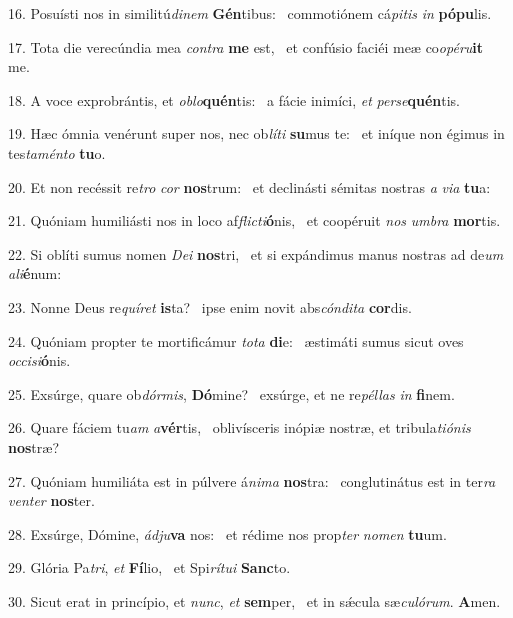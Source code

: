 16. Posuísti nos in similitú\textit{di}\textit{nem} \textbf{Gén}tibus: \ast\  commotiónem cá\textit{pi}\textit{tis} \textit{in} \textbf{pó}\textbf{pu}lis.\

17. Tota die verecúndia mea \textit{con}\textit{tra} \textbf{me} est, \ast\  et confúsio faciéi meæ co\textit{o}\textit{pé}\textit{ru}\textbf{it} me.\

18. A voce exprobrántis, et \textit{ob}\textit{lo}\textbf{quén}tis: \ast\  a fácie inimíci, \textit{et} \textit{per}\textit{se}\textbf{quén}tis.\

19. Hæc ómnia venérunt super nos, nec ob\textit{lí}\textit{ti} \textbf{su}mus te: \ast\  et iníque non égimus in tes\textit{ta}\textit{mén}\textit{to} \textbf{tu}o.\

20. Et non recéssit re\textit{tro} \textit{cor} \textbf{nos}trum: \ast\  et declinásti sémitas nostras \textit{a} \textit{vi}\textit{a} \textbf{tu}a:\

21. Quóniam humiliásti nos in loco af\textit{flic}\textit{ti}\textbf{ó}nis, \ast\  et coopéruit \textit{nos} \textit{um}\textit{bra} \textbf{mor}tis.\

22. Si oblíti sumus nomen \textit{De}\textit{i} \textbf{nos}tri, \ast\  et si expándimus manus nostras ad de\textit{um} \textit{a}\textit{li}\textbf{é}num:\

23. Nonne Deus re\textit{quí}\textit{ret} \textbf{is}ta? \ast\  ipse enim novit abs\textit{cón}\textit{di}\textit{ta} \textbf{cor}dis.\

24. Quóniam propter te mortificámur \textit{to}\textit{ta} \textbf{di}e: \ast\  æstimáti sumus sicut oves \textit{oc}\textit{ci}\textit{si}\textbf{ó}nis.\

25. Exsúrge, quare ob\textit{dór}\textit{mis}, \textbf{Dó}mine? \ast\  exsúrge, et ne re\textit{pél}\textit{las} \textit{in} \textbf{fi}nem.\

26. Quare fáciem tu\textit{am} \textit{a}\textbf{vér}tis, \ast\  oblivísceris inópiæ nostræ, et tribula\textit{ti}\textit{ó}\textit{nis} \textbf{nos}træ?\

27. Quóniam humiliáta est in púlvere á\textit{ni}\textit{ma} \textbf{nos}tra: \ast\  conglutinátus est in ter\textit{ra} \textit{ven}\textit{ter} \textbf{nos}ter.\

28. Exsúrge, Dómine, \textit{ád}\textit{ju}\textbf{va} nos: \ast\  et rédime nos prop\textit{ter} \textit{no}\textit{men} \textbf{tu}um.\

29. Glória Pa\textit{tri}, \textit{et} \textbf{Fí}lio, \ast\  et Spi\textit{rí}\textit{tu}\textit{i} \textbf{Sanc}to.\

30. Sicut erat in princípio, et \textit{nunc}, \textit{et} \textbf{sem}per, \ast\  et in sǽcula sæ\textit{cu}\textit{ló}\textit{rum}. \textbf{A}men.\

